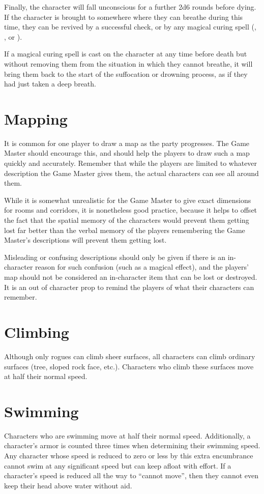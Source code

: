 \begin{multicols*}{2}
Finally, the character will fall unconscious for a further 2d6 rounds before dying. If the character is brought to somewhere where they can breathe during this time, they can be revived by a successful  check, or by any magical curing spell (, ,  or ).

If a magical curing spell is cast on the character at any time before death but without removing them from the situation in which they cannot breathe, it will bring them back to the start of the suffocation or drowning process, as if they had just taken a deep breath.

\section{Mapping}
It is common for one player to draw a map as the party progresses. The Game Master should encourage this, and should help the players to draw such a map quickly and accurately. Remember that while the players are limited to whatever description the Game Master gives them, the actual characters can see all around them.

While it is somewhat unrealistic for the Game Master to give exact dimensions for rooms and corridors, it is nonetheless good practice, because it helps to offset the fact that the spatial memory of the characters would prevent them getting lost far better than the verbal memory of the players remembering the Game Master’s descriptions will prevent them getting lost.

Misleading or confusing descriptions should only be given if there is an in-character reason for such confusion (such as a magical effect), and the players’ map should not be considered an in-character item that can be lost or destroyed. It is an out of character prop to remind the players of what their characters can remember.

\section{Climbing}
Although only rogues can climb sheer surfaces, all characters can climb ordinary surfaces (tree, sloped rock face, etc.). Characters who climb these surfaces move at half their normal speed.

\section{Swimming}
Characters who are swimming move at half their normal speed. Additionally, a character’s armor is counted three times when determining their swimming speed. Any character whose speed is reduced to zero or less by this extra encumbrance cannot swim at any significant speed but can keep afloat with effort. If a character’s speed is reduced all the way to “cannot move”, then they cannot even keep their head above water without aid.


\end{multicols*}
